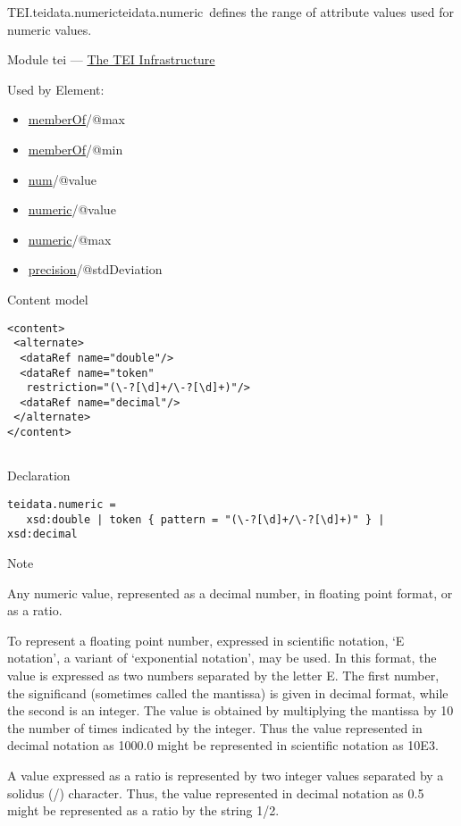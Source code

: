 \begin{reflist}
\item[]\begin{specHead}{TEI.teidata.numeric}{teidata.numeric} defines the range of attribute values used for numeric values.\end{specHead} 
    \item[{Module}]
  tei — \hyperref[ST]{The TEI Infrastructure}
    \item[{Used by}]
  Element: \begin{itemize}
\item \hyperref[TEI.memberOf]{memberOf}/@max
\item \hyperref[TEI.memberOf]{memberOf}/@min
\item \hyperref[TEI.num]{num}/@value
\item \hyperref[TEI.numeric]{numeric}/@value
\item \hyperref[TEI.numeric]{numeric}/@max
\item \hyperref[TEI.precision]{precision}/@stdDeviation
\end{itemize} 
    \item[{Content model}]
  \mbox{}\hfill\\[-10pt]\begin{Verbatim}[fontsize=\small]
<content>
 <alternate>
  <dataRef name="double"/>
  <dataRef name="token"
   restriction="(\-?[\d]+/\-?[\d]+)"/>
  <dataRef name="decimal"/>
 </alternate>
</content>
    
\end{Verbatim}

    \item[{Declaration}]
  \mbox{}\hfill\\[-10pt]\begin{Verbatim}[fontsize=\small]
teidata.numeric =
   xsd:double | token { pattern = "(\-?[\d]+/\-?[\d]+)" } | xsd:decimal
\end{Verbatim}

    \item[{Note}]
  \par
Any numeric value, represented as a decimal number, in floating point format, or as a ratio.\par
To represent a floating point number, expressed in scientific notation, ‘E notation’, a variant of ‘exponential notation’, may be used. In this format, the value is expressed as two numbers separated by the letter E. The first number, the significand (sometimes called the mantissa) is given in decimal format, while the second is an integer. The value is obtained by multiplying the mantissa by 10 the number of times indicated by the integer. Thus the value represented in decimal notation as 1000.0 might be represented in scientific notation as 10E3.\par
A value expressed as a ratio is represented by two integer values separated by a solidus (/) character. Thus, the value represented in decimal notation as 0.5 might be represented as a ratio by the string 1/2.
\end{reflist}  
